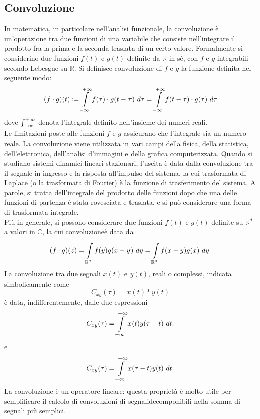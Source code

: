 \documentclass[12pt,oneside,openany]{memoir}
\numberwithin{equation}{subsection}
\newcommand{\dt}{\ dt}
\begin{document}

\newpage
\subsection{Convoluzione}
In matematica, in particolare nell'analisi funzionale, la convoluzione \`e
un'operazione tra due funzioni di una variabile che consiste nell'integrare il
prodotto fra la prima e la seconda traslata di un certo valore.
\bigbreak
Formalmente si considerino due funzioni $f(t)$ e $g(t)$ definite da $\mathbb{R}$
in s\`e, con $f$ e $g$ integrabili secondo Lebesgue su $\mathbb{R}$. Si
definisce convoluzione di $f$ e $g$ la funzione definita nel seguente modo:
\[
    (f \cdot g)(t) \coloneqq \int\displaylimits_{-\infty}^{+\infty} f(\tau)
    \cdot g(t - \tau) \ d \tau = \int\displaylimits_{-\infty}^{+\infty}
    f(t - \tau) \cdot g(\tau) \ d \tau
\]
dove $\int\displaylimits_{-\infty}^{+\infty}$ denota l'integrale definito
nell'insieme dei numeri reali.\\
Le limitazioni poste alle funzioni $f$ e $g$ assicurano che l'integrale sia un
numero reale.
\bigbreak
La convoluzione viene utilizzata in vari campi della fisica, della statistica,
dell'elettronica, dell'analisi d'immagini e della grafica computerizzata.
Quando si studiano sistemi dinamici lineari stazionari, l'uscita è data dalla
convoluzione tra il segnale in ingresso e la risposta all'impulso del sistema,
la cui trasformata di Laplace (o la trasformata di Fourier) \`e la funzione di
trasferimento del sistema.
\bigbreak
A parole, si tratta dell'integrale del prodotto delle funzioni dopo che una
delle funzioni di partenza \`e stata rovesciata e traslata, e si pu\`o
considerare una forma di trasformata integrale.\\
Pi\`u in generale, si possono considerare due funzioni $f(t)$ e $g(t)$ definite
su $\mathbb{R}^d$ a valori in $\mathbb{C}$, la cui convoluzione\`e data da
\[
    (f \cdot g)(z) = \int\displaylimits_{\mathbb{R}^d}^{} f(y) g(x - y) \ dy =
    \int\displaylimits_{\mathbb{R}^d}^{} f(x - y) g(x) \ dy.
\]
\bigbreak
La convoluzione tra due segnali $x(t)$ e $y(t)$, reali o complessi, indicata
simbolicamente come
\[
    C_{xy}(\tau) = x(t) \ast y(t)
\]
\`e data, indifferentemente, dalle due espressioni
\[
    C_{xy}(\tau) = \int\displaylimits_{-\infty}^{+\infty} x(t) y(\tau - t) \dt.
\]
e
\[
    C_{xy}(\tau) = \int\displaylimits_{-\infty}^{+\infty} x(\tau - t) y(t) \dt.
\]
La convoluzione \`e un operatore lineare: questa propriet\`a \`e molto utile per
semplificare il calcolo di convoluzioni di segnalidecomponibili nella somma di
segnali pi\`u semplici.
\end{document}
